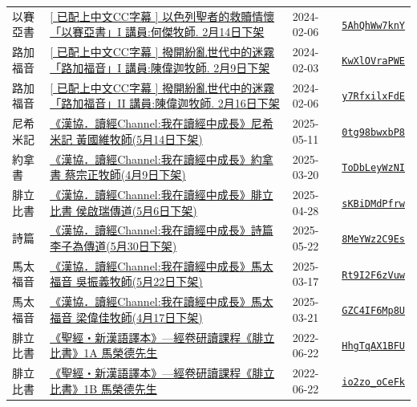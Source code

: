 \documentclass{book}
\begin{document}
{\begin{xltabular}{\textwidth}{|p{0.15\textwidth} p{0.6\textwidth}|p{0.07\textwidth} p{0.1\textwidth}|}
以賽亞書   & \hyperref[sec:5AhQhWw7knY]{[ 已配上中文CC字幕 ] 以色列聖者的救贖情懷「以賽亞書」I 講員:何傑牧師. 2月14日下架} & 2024-02-06 & \href{https://youtube.com/watch?v=5AhQhWw7knY}{\texttt{5AhQhWw7knY}} \\
路加福音   & \hyperref[sec:KwXlOVraPWE]{[ 已配上中文CC字幕 ] 撥開紛亂世代中的迷霧「路加福音」I  講員:陳偉迦牧師. 2月9日下架} & 2024-02-03 & \href{https://youtube.com/watch?v=KwXlOVraPWE}{\texttt{KwXlOVraPWE}} \\
路加福音   & \hyperref[sec:y7RfxilxFdE]{[ 已配上中文CC字幕 ] 撥開紛亂世代中的迷霧「路加福音」II  講員:陳偉迦牧師. 2月16日下架} & 2024-02-06 & \href{https://youtube.com/watch?v=y7RfxilxFdE}{\texttt{y7RfxilxFdE}} \\
尼希米記   & \hyperref[sec:0tg98bwxbP8]{《漢協．讀經Channel:我在讀經中成長》尼希米記 黃國維牧師(5月14日下架)} & 2025-05-11 & \href{https://youtube.com/watch?v=0tg98bwxbP8}{\texttt{0tg98bwxbP8}} \\
約拿書   & \hyperref[sec:ToDbLeyWzNI]{《漢協．讀經Channel:我在讀經中成長》約拿書 蔡宗正牧師(4月9日下架)} & 2025-03-20 & \href{https://youtube.com/watch?v=ToDbLeyWzNI}{\texttt{ToDbLeyWzNI}} \\
腓立比書   & \hyperref[sec:sKBiDMdPfrw]{《漢協．讀經Channel:我在讀經中成長》腓立比書 侯啟瑞傳道(5月6日下架)} & 2025-04-28 & \href{https://youtube.com/watch?v=sKBiDMdPfrw}{\texttt{sKBiDMdPfrw}} \\
詩篇   & \hyperref[sec:8MeYWz2C9Es]{《漢協．讀經Channel:我在讀經中成長》詩篇 李子為傳道(5月30日下架)} & 2025-05-22 & \href{https://youtube.com/watch?v=8MeYWz2C9Es}{\texttt{8MeYWz2C9Es}} \\
馬太福音   & \hyperref[sec:Rt9I2F6zVuw]{《漢協．讀經Channel:我在讀經中成長》馬太福音 吳振義牧師(5月22日下架)} & 2025-03-17 & \href{https://youtube.com/watch?v=Rt9I2F6zVuw}{\texttt{Rt9I2F6zVuw}} \\
馬太福音   & \hyperref[sec:GZC4IF6Mp8U]{《漢協．讀經Channel:我在讀經中成長》馬太福音 梁偉佳牧師(4月17日下架)} & 2025-03-21 & \href{https://youtube.com/watch?v=GZC4IF6Mp8U}{\texttt{GZC4IF6Mp8U}} \\
腓立比書   & \hyperref[sec:HhgTqAX1BFU]{《聖經‧新漢語譯本》—經卷研讀課程《腓立比書》1A 馬榮德先生} & 2022-06-22 & \href{https://youtube.com/watch?v=HhgTqAX1BFU}{\texttt{HhgTqAX1BFU}} \\
腓立比書   & \hyperref[sec:io2zo_oCeFk]{《聖經‧新漢語譯本》—經卷研讀課程《腓立比書》1B 馬榮德先生} & 2022-06-22 & \href{https://youtube.com/watch?v=io2zo_oCeFk}{\texttt{io2zo\_oCeFk}} \\

\end{xltabular}}
\end{document}
